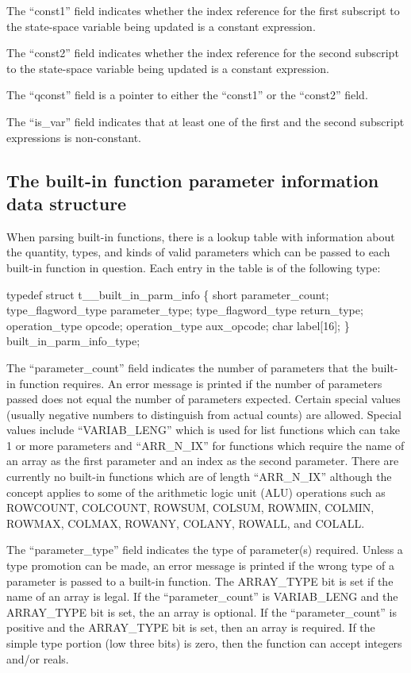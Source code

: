 The ``const1'' field indicates whether the index reference for the first
subscript to the state-space variable being updated is a constant expression.

The ``const2'' field indicates whether the index reference for the second
subscript to the state-space variable being updated is a constant expression.

The ``qconst'' field is a pointer to either the ``const1'' or the ``const2''
field.

The ``is\_var'' field indicates that at least one of the first and the second
subscript expressions is non-constant.

\subsection{The built-in function parameter information data structure}
\label{sec:bin}

When parsing built-in functions, there is a lookup table with information
about the quantity, types, and kinds of valid parameters which can
be passed to each built-in function in question.   Each entry in the table
is of the following type:
\begin{codeexample}
typedef struct t__built_in_parm_info
   \{
       short parameter_count;
       type_flagword_type parameter_type;
       type_flagword_type return_type;
       operation_type opcode;
       operation_type aux_opcode;
       char label[16];
   \} built_in_parm_info_type;
\end{codeexample}



The ``parameter\_count'' field indicates the number of parameters that
the built-in function requires.    An error message is printed if the
number of parameters passed does not equal the number of parameters
expected.    Certain special values (usually negative numbers to distinguish
from actual counts) are allowed.   Special values include ``VARIAB\_LENG''
which is used for list functions which can take 1 or more parameters and
``ARR\_N\_IX'' for functions which require the name of an array as the first
parameter and an index as the second parameter.    There are currently no
built-in functions which are of length ``ARR\_N\_IX'' although the concept
applies to some of the arithmetic logic unit (ALU) operations such as
ROWCOUNT, COLCOUNT, ROWSUM, COLSUM, ROWMIN, COLMIN, ROWMAX, COLMAX, ROWANY,
COLANY, ROWALL, and COLALL.

The ``parameter\_type'' field indicates the type of parameter(s) required.
Unless a type promotion can be made, an error message is printed
if the wrong type of a parameter is passed to a built-in function.   The
ARRAY\_TYPE bit is set if the name of an array is legal.
If the ``parameter\_count'' is VARIAB\_LENG and the ARRAY\_TYPE bit is set,
the an array is optional.
If the ``parameter\_count'' is positive and the ARRAY\_TYPE bit is set,
then an array is required.
If the simple type portion (low three bits) is zero, then the function
can accept integers and/or reals.

